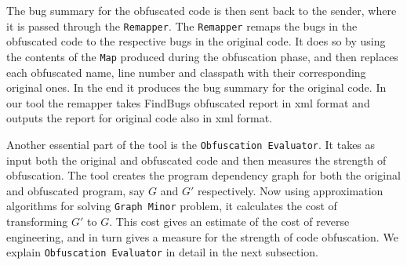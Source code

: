 \documentclass[conference]{IEEEtran}
\begin{document}
The bug summary for the obfuscated code is then sent back to the sender, where it is passed through the {\tt Remapper}. The {\tt Remapper} remaps the bugs in the obfuscated code to 
the respective bugs in the original code. It does so by using the contents of the {\tt Map} produced during the obfuscation phase, and then replaces each obfuscated name, line number 
and classpath with their corresponding original ones. In the end it produces the bug summary for the original code. In our tool the remapper takes FindBugs obfuscated report in xml 
format and outputs the report for original code also in xml format.

Another essential part of the tool is the {\tt Obfuscation Evaluator}. It takes as input both the original and obfuscated code and then measures the strength of obfuscation. The tool 
creates the program dependency graph for both the original and obfuscated program, say $G$ and $G'$ respectively. Now using approximation algorithms for solving {\tt Graph Minor} 
\cite{graphminor} problem, it calculates the cost of transforming $G'$ to $G$. This cost gives an estimate of the cost of reverse engineering, and in turn gives a measure for the 
strength of code obfuscation. We explain {\tt Obfuscation Evaluator} in detail in the next subsection.
\end{document}
